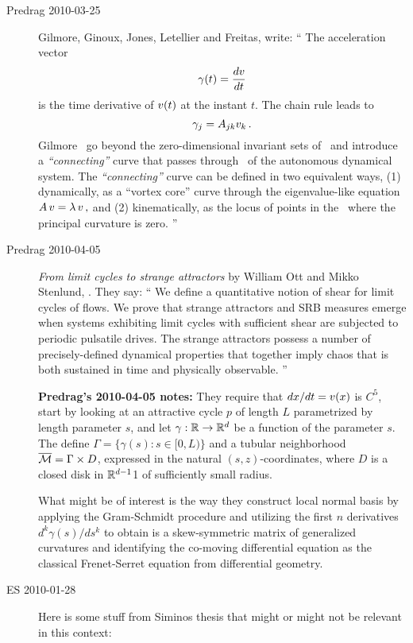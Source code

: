 \begin{description}

\item[Predrag 2010-03-25 ]
Gilmore, Ginoux, Jones,
Letellier and Freitas, 
write: ``
The acceleration vector
\[
\gamma(t) = \frac{d v}{dt}
\]
is the time derivative of $v(t)$ at the instant $t$. The
chain rule leads to
\[
\gamma_j = A_{jk}v_k
\,.
\]
Gilmore \etal\ go beyond the zero-dimensional invariant sets of \eqva\
and introduce a {\em ``connecting''} curve that passes through  \eqva\ of
the autonomous dynamical system. The {\em ``connecting''} curve  can be
defined in two equivalent ways, (1) dynamically, as a ``vortex core''
curve through the eigenvalue-like equation
\(
A \, v = \lambda  \, v
\,,
\)
and (2) kinematically, as the locus of points in the \statesp\ where the
principal curvature is zero.
''


\item[Predrag 2010-04-05 ]
\emph{From limit cycles to strange attractors}
by
William Ott and Mikko Stenlund,
.
They say:
``
We define a quantitative notion of shear for limit cycles of flows. We
prove that strange attractors and SRB measures emerge when systems
exhibiting limit cycles with sufficient shear are subjected to periodic
pulsatile drives. The strange attractors possess a number of
precisely-defined dynamical properties that together imply chaos that is
both sustained in time and physically observable.
''

{\bf Predrag's 2010-04-05 notes:}
They require that $dx/dt = v(x)$ is $C^5$, start by looking at
an attractive cycle $p$ of length $L$ parametrized by length parameter
$s$, and let $\gamma : \mathbb{R} \to \mathbb{R}^d$ be a function of the
parameter $s$. The define $\Gamma = \{ \gamma(s) : s \in [0,L) \} $ and a
tubular neighborhood $\overline{{\cal M}} =\Gamma \times D$, expressed in the
natural $(s,z )$-coordinates, where $D$ is a closed disk in
$\mathbb{R}^{d-1}$1 of sufficiently small radius.

What might be of interest is the way they construct local normal basis by
applying the Gram-Schmidt procedure and utilizing the first $n$
derivatives $d^k\gamma(s)/ds^k$ to obtain is a skew-symmetric matrix of
generalized curvatures and identifying the co-moving differential
equation as the classical Frenet-Serret equation from differential
geometry.

\item[ES 2010-01-28]
Here is some stuff from Siminos thesis that might or might not be
relevant in this context:


\end{description}
